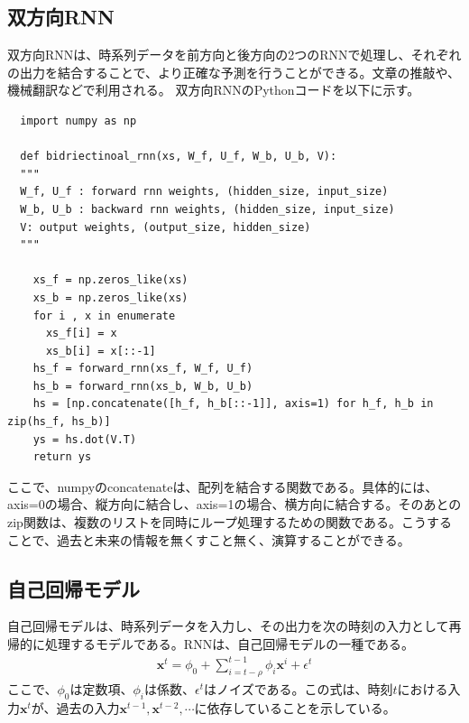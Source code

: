 \documentclass{ltjsarticle}
\begin{document}
\subsection{双方向RNN}
双方向RNNは、時系列データを前方向と後方向の2つのRNNで処理し、それぞれの出力を結合することで、より正確な予測を行うことができる。文章の推敲や、機械翻訳などで利用される。
双方向RNNのPythonコードを以下に示す。
\begin{itembox}[l]{}
\begin{verbatim}
  import numpy as np

  def bidriectinoal_rnn(xs, W_f, U_f, W_b, U_b, V):
  """
  W_f, U_f : forward rnn weights, (hidden_size, input_size)
  W_b, U_b : backward rnn weights, (hidden_size, input_size)
  V: output weights, (output_size, hidden_size)
  """

    xs_f = np.zeros_like(xs)
    xs_b = np.zeros_like(xs)
    for i , x in enumerate
      xs_f[i] = x
      xs_b[i] = x[::-1]
    hs_f = forward_rnn(xs_f, W_f, U_f)
    hs_b = forward_rnn(xs_b, W_b, U_b)
    hs = [np.concatenate([h_f, h_b[::-1]], axis=1) for h_f, h_b in zip(hs_f, hs_b)]
    ys = hs.dot(V.T)
    return ys
\end{verbatim}
\end{itembox}
ここで、numpyのconcatenateは、配列を結合する関数である。具体的には、axis=0の場合、縦方向に結合し、axis=1の場合、横方向に結合する。そのあとのzip関数は、複数のリストを同時にループ処理するための関数である。こうすることで、過去と未来の情報を無くすこと無く、演算することができる。


\subsection{自己回帰モデル}
自己回帰モデルは、時系列データを入力し、その出力を次の時刻の入力として再帰的に処理するモデルである。RNNは、自己回帰モデルの一種である。
\begin{align}
  \mathbf{x}^t = \phi_0 + \sum_{i=t-\rho}^{t-1} \phi_i \mathbf{x}^i + \epsilon^t
\end{align}
ここで、$\phi_0$は定数項、$\phi_i$は係数、$\epsilon^t$はノイズである。この式は、時刻$t$における入力$\mathbf{x}^t$が、過去の入力$\mathbf{x}^{t-1}, \mathbf{x}^{t-2}, \cdots$に依存していることを示している。
\end{document}
